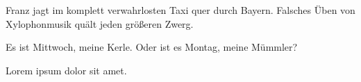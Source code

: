 Franz jagt im komplett verwahrlosten Taxi quer durch Bayern.
Falsches Üben von Xylophonmusik quält jeden größeren Zwerg.

Es ist Mittwoch, meine Kerle. Oder ist es Montag, meine Mümmler?

Lorem ipsum dolor sit amet.
